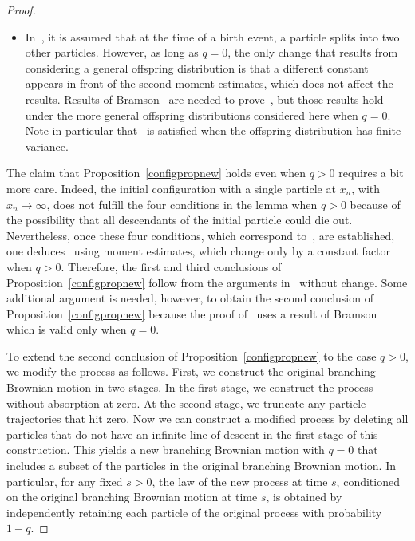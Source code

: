 \documentclass[AHL,Unicode,longabstracts,published]{cedram}
\newcommand{\1} {\mathds{1}}
\begin{document}
\begin{proof}
\begin{itemize}
\item In~\cite{bbs3}, it is assumed that at the time of a birth event, a particle splits into two other particles. However, as long as $q = 0$, the only change that results from considering a general offspring distribution is that a different constant appears in front of the second moment estimates, which does not affect the results. Results of Bramson~\cite{bram83} are needed to prove~\cite[Theorem~2]{bbs3}, but those results hold under the more general offspring distributions considered here when $q = 0$. Note in particular that~\cite[equation~(1.2$'$) on page~5]{bram83} is satisfied when the offspring distribution has finite variance.
\end{itemize}
The claim that Proposition~\ref{configpropnew} holds even when $q > 0$ requires a bit more care. Indeed, the initial configuration with a single particle at $x_n$, with $x_n \rightarrow \infty$, does not fulfill the four conditions in the lemma when $q > 0$ because of the possibility that all descendants of the initial particle could die out. Nevertheless, once these four conditions, which correspond to~\cite[Lemma~15]{bbs3}, are established, one deduces~\cite[Theorems~1, 3, and~4]{bbs3} using moment estimates, which change only by a constant factor when $q > 0$. Therefore, the first and third conclusions of Proposition~\ref{configpropnew} follow from the arguments in~\cite{bbs3} without change. Some additional argument is needed, however, to obtain the second conclusion of Proposition~\ref{configpropnew} because the proof of~\cite[Theorem~2]{bbs3} uses a result of Bramson~\cite{bbs3} which is valid only when $q = 0$.

To extend the second conclusion of Proposition~\ref{configpropnew} to the case $q > 0$, we modify the process as follows. First, we construct the original branching Brownian motion in two stages. In the first stage, we construct the process without absorption at zero. At the second stage, we truncate any particle trajectories that hit zero. Now we can construct a modified process by deleting all particles that do not have an infinite line of descent in the first stage of this construction. This yields a new branching Brownian motion with $q = 0$ that includes a subset of the particles in the original branching Brownian motion. In particular, for any fixed $s > 0$, the law of the new process at time $s$, conditioned on the original branching Brownian motion at time $s$, is obtained by independently retaining each particle of the original process with probability $1 - q$.


\end{proof}
\end{document}
